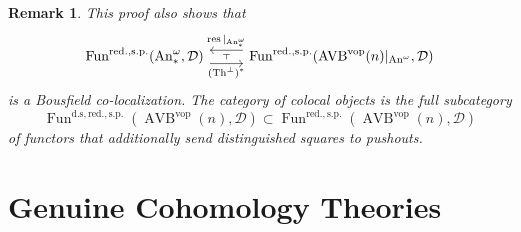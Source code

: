 \documentclass{article}
\newcommand{\vop}{\mathrm{vop}}
\DeclareMathOperator{\AVB}{AVB}
\DeclareMathOperator{\An}{An}
\DeclareMathOperator{\Fun}{Fun}
\DeclareMathOperator{\res}{res}
\DeclareMathOperator{\Th}{Th}
\newtheorem{remark}{Remark}
\begin{document}
\begin{remark}
    This proof also shows that 
    \[\begin{tikzcd}
        {\Fun^{\mathrm{red.,s.p.}}(\An_*^\omega,\mathcal D)} & {\Fun^{\mathrm{red.,s.p.}}(\AVB^\vop(n)|_{\An^\omega},\mathcal D)}
        \arrow[""{name=0, anchor=center, inner sep=0}, "{(\Th^\perp)^*}"', shift right=2, from=1-1, to=1-2]
        \arrow[""{name=1, anchor=center, inner sep=0}, "{\res|_{\An_*^\omega}}"', shift right=2, from=1-2, to=1-1]
        \arrow["\dashv"{anchor=center, rotate=90}, draw=none, from=0, to=1]
    \end{tikzcd}\]    
is a Bousfield co-localization. The category of colocal objects is the full subcategory 
\[
\Fun^{\mathrm{d.s,red.,s.p.}}(\AVB^\vop(n), \mathcal D) \subset \Fun^{\mathrm{red.,s.p.}}(\AVB^\vop(n), \mathcal D) 
\]
of functors that additionally send distinguished squares to pushouts.
\end{remark}

\section{Genuine Cohomology Theories}\label{section:Genuinecohomologytheories}
\end{document}
